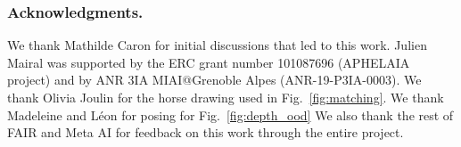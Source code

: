 \subsubsection*{Acknowledgments.}
We thank Mathilde Caron for initial discussions that led to this work. Julien Mairal was supported by the ERC grant number 101087696 (APHELAIA project) and by ANR 3IA MIAI@Grenoble Alpes (ANR-19-P3IA-0003). We thank Olivia Joulin for the horse drawing used in Fig.~\ref{fig:matching}.
We thank Madeleine and Léon for posing for Fig.~\ref{fig:depth_ood}
We also thank the rest of FAIR and Meta AI for feedback on this work through the entire project.


